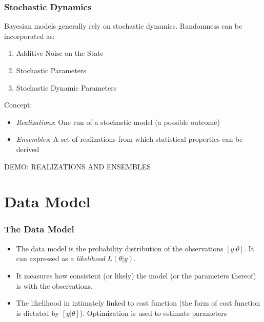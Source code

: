 \documentclass{beamer}
\begin{document}
\frame%
{\frametitle{Stochastic Dynamics}

Bayesian models generally rely on stochastic dynamics. Randomness can be incorporated as:
\begin{enumerate}
\item
Additive Noise on the State
\item
Stochastic Parameters
\item
Stochastic Dynamic Parameters
\end{enumerate}

\medskip
Concept: 
\begin{itemize}
\item
{\it Realizations}: One run of a stochastic model (a possible outcome)

\item
{\it Ensembles}: A set of realizations from which statistical properties can be derived

\end{itemize}

\medskip
\color{red} DEMO: REALIZATIONS AND ENSEMBLES

}

\section{Data Model}

\frame%
{\frametitle{The Data Model}

\begin{itemize}
\item
The data model is the probability distribution of the observations $[y|\theta]$. It can expressed as a {\it likelihood} $L(\theta|y)$.
\item
It measures how consistent (or likely) the model (or the parameters thereof) is with the observations. 
\item
The likelihood in intimately linked to cost function (the form of cost function is dictated by $[y|\theta]$). Optimization is used to estimate parameters
\end{itemize}
}
\end{document}
